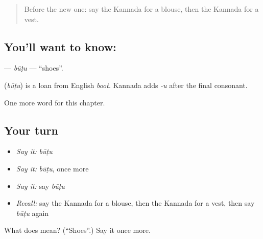 \label{lesson:KA-C222-butu}



\begin{quote}
Before the new one: say the Kannada for a blouse, then the Kannada for a vest.
\end{quote}

\subsection*{You'll want to know: }
\textbf{} — \emph{būṭu} — \textquotedblleft{}shoes\textquotedblright{}.

\begin{cousinweb}
\textbf{} (\emph{būṭu}) is a loan from English \emph{boot}. Kannada adds \emph{-u} after the final consonant.
\end{cousinweb}

\begin{grammarlens}[title={What you've built}]
One more word for this chapter.
\end{grammarlens}

\subsection*{Your turn}
\begin{itemize}
\raggedright
  \item \emph{Say it:} \emph{būṭu}
  \item \emph{Say it:} \emph{būṭu}, once more
  \item \emph{Say it:} say \emph{būṭu}
  \item \emph{Recall:} say the Kannada for a blouse, then the Kannada for a vest, then say \emph{būṭu} again
\end{itemize}

\begin{tcolorbox}[breakable,colback=teal!4,colframe=teal!35!black,title={Before you move on}]
What does  mean? (\textquotedblleft{}Shoes\textquotedblright{}.) Say it once more.
\end{tcolorbox}

